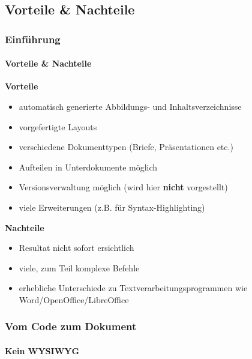 \subsection{Vorteile \& Nachteile}
\begin{frame}
\frametitle{Einführung}
\framesubtitle{Vorteile \& Nachteile}
\textbf{Vorteile}
\begin{itemize}
\item  automatisch generierte Abbildungs- und Inhaltsverzeichnisse
\item  vorgefertigte Layouts
\item  verschiedene Dokumenttypen (Briefe, Präsentationen etc.)
\item  Aufteilen in Unterdokumente möglich
\item  Versionsverwaltung möglich (wird hier \textbf{nicht} vorgestellt)
\item  viele Erweiterungen (z.B. für Syntax-Highlighting)
\end{itemize}

\textbf{Nachteile}
\begin{itemize}
\item  Resultat nicht sofort ersichtlich
\item  viele, zum Teil komplexe Befehle
\item  erhebliche Unterschiede zu Textverarbeitungsprogrammen wie Word/OpenOffice/LibreOffice
\end{itemize}
\end{frame}



\begin{frame}
\frametitle{Vom Code zum Dokument}
\framesubtitle{Kein WYSIWYG}
\begin{columns}
\begin{column}{.7\textwidth}
\end{column}
\begin{column}{.3\textwidth}
\end{column}
\end{columns}
\end{frame}


